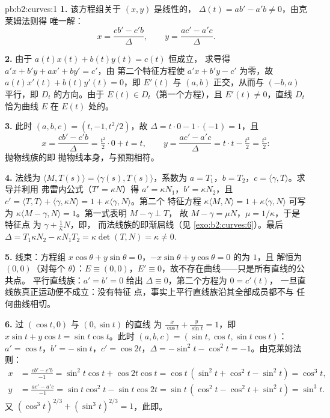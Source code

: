 \begin{solution}{pb:b2:curves:1}
\textbf{1.} 该方程组关于 $(x, y)$ 是线性的，
$\Delta(t) = a b' - a'b \neq 0$，由克莱姆法则得
唯一解：
\[
x = \frac{c b' - c' b}{\Delta}, \qquad
y = \frac{a c' - a' c}{\Delta}.
\]

\textbf{2.} 由于 $a(t)x(t) + b(t)y(t) = c(t)$ 恒成立，
求导得 $a'x + b'y + ax' + by' = c'$，由
第二个特征方程使 $a'x + b'y - c'$ 为零，故
$a(t)x'(t) + b(t)y'(t) = 0$，即 $E'(t)$ 与 $(a,
b)$ 正交，从而与 $(-b, a)$ 平行，即 $D_t$ 的方向。由于
$E(t) \in D_t$（第一个方程），且 $E'(t) \neq 0$，直线
$D_t$ 恰为曲线 $E$ 在 $E(t)$ 处的。

\textbf{3.} 此时 $(a, b, c) = (t, -1, t^2/2)$，故 $\Delta =
t\cdot0 - 1\cdot(-1) = 1$，且
\[
x = \frac{c b' - c' b}{\Delta} = \tfrac{t^2}2\cdot 0 +
t = t, \qquad
y = \frac{a c' - a' c}{\Delta} = t\cdot t - \tfrac{t^2}2 =
\tfrac{t^2}2 :
\]
抛物线族的即
抛物线本身，与预期相符。

\textbf{4.} 法线为 $\langle M, T(s)\rangle =
\langle\gamma(s), T(s)\rangle$，系数为 $a = T_1$，$b =
T_2$，$c = \langle\gamma, T\rangle$。求导并利用
弗雷内公式（$T' = \kappa N$）得 $a' = \kappa N_1$，$b' = \kappa
N_2$，且 $c' = \langle T, T\rangle + \langle\gamma, \kappa
N\rangle = 1 + \kappa\langle\gamma, N\rangle$。第二个
特征方程 $\kappa\langle M, N\rangle = 1 +
\kappa\langle\gamma, N\rangle$ 可写为 $\kappa\langle M -
\gamma, N\rangle = 1$。第一式表明 $M - \gamma \perp T$，
故 $M - \gamma = \mu N$，$\mu = 1/\kappa$，于是特征点
为 $\gamma + \frac1\kappa N$，即，
而法线族的即渐屈线（见
\cref{exo:b2:curves:6}）。最后 $\Delta = T_1\kappa N_2 -
\kappa N_1 T_2 = \kappa\det(T, N) = \kappa \neq 0$.

\textbf{5.} 线束：方程组 $x\cos\theta + y\sin\theta =
0$，$-x\sin\theta + y\cos\theta = 0$ 的为 $1$，且
解恒为 $(0,0)$（对每个 $\theta$）：$E \equiv (0,0)$，$E'
\equiv 0$，故不存在曲线——只是所有直线的公共点。
平行直线族：$a' = b' = 0$ 给出
$\Delta \equiv 0$，第二个方程为 $0 = c'(t)$，
一旦直线族真正运动便不成立：没有特征
点，事实上平行直线族沿其全部成员都不与
任何曲线相切。

\textbf{6.} 过 $(\cos t, 0)$ 与 $(0, \sin t)$ 的直线
为 $\frac x{\cos t} + \frac y{\sin t} = 1$，即 $x\sin t +
y\cos t = \sin t\cos t$。此时 $(a, b, c) = (\sin t, \cos t,
\sin t\cos t)$：$a' = \cos t$，$b' = -\sin t$，$c' = \cos
2t$，$\Delta = -\sin^2 t - \cos^2 t = -1$。由克莱姆法则：
\begin{align*}
x &= \frac{cb' - c'b}{-1} = \sin^2 t\cos t + \cos 2t\cos t
= \cos t\,(\sin^2 t + \cos^2 t - \sin^2 t) = \cos^3 t,\\
y &= \frac{ac' - a'c}{-1} = \sin t\cos^2 t - \sin t\cos 2t
= \sin t\,(\cos^2 t - \cos^2 t + \sin^2 t) = \sin^3 t .
\end{align*}
又 $(\cos^3t)^{2/3} + (\sin^3t)^{2/3} = 1$，此即。


\end{solution}
